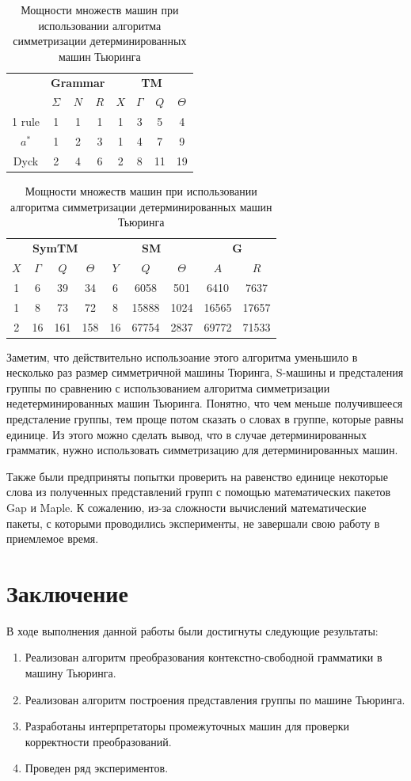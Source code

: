 \documentclass[14pt]{matmex-diploma-custom}
\begin{document}
\begin{table}[H]
\centering
\begin{tabular}{|c|
c|c|c|
c|c|c|c|}
\hline
&
\multicolumn{3}{|c|}{\textbf{Grammar}}&
\multicolumn{4}{|c|}{\textbf{TM}}\\
\cline{2-8}
&$\Sigma$&$N$&$R$
&$X$&$\Gamma$&$Q$&$\Theta$\\
\hline
1 rule
&1&1&1
&1&3&5&4\\
\hline
$a^*$
&1&2&3
&1&4&7&9\\
\hline
Dyck
&2&4&6
&2&8&11&19\\
\hline
\end{tabular}
\begin{tabular}{
|c|c|c|c|
c|c|c|
c|c|}
\hline
\multicolumn{4}{|c|}{\textbf{SymTM}}&
\multicolumn{3}{|c|}{\textbf{SM}}&
\multicolumn{2}{|c|}{\textbf{G}}\\
\cline{1-9}
$X$&$\Gamma$&$Q$&$\Theta$
&$Y$&$Q$&$\Theta$
&$A$&$R$\\
\hline
1&6&39&34
&6&6058&501
&6410&7637\\
\hline
1&8&73&72
&8&15888&1024
&16565&17657\\
\hline
2&16&161&158
&16&67754&2837
&69772&71533\\
\hline
\end{tabular}
\caption{Мощности множеств машин при использовании алгоритма симметризации детерминированных машин Тьюринга}
\label{tab:countdtm}
\end{table}

Заметим, что действительно использоание этого алгоритма уменьшило в несколько раз размер симметричной машины Тюринга, S-машины и предсталения группы по сравнению с использованием алгоритма симметризации недетерминированных машин Тьюринга. Понятно, что чем меньше получившееся предсталение группы, тем проще потом сказать о словах в группе, которые равны единице. Из этого можно сделать вывод, что в случае детерминированных грамматик, нужно использовать симметризацию для детерминированных машин.

Также были предприняты попытки проверить на равенство единице некоторые слова из полученных представлений групп с помощью математических пакетов Gap и Maple. К сожалению, из-за сложности вычислений математические пакеты, с которыми проводились эксперименты, не завершали свою работу в приемлемое время.

\section*{Заключение}
В ходе выполнения данной работы были достигнуты следующие результаты:
\begin{enumerate}
    \item Реализован алгоритм преобразования контекстно-свободной грамматики в машину Тьюринга.
    \item Реализован алгоритм построения представления группы по машине Тьюринга.
    \item Разработаны интерпретаторы промежуточных машин для проверки корректности преобразований.
    \item Проведен ряд экспериментов.
\end{enumerate}
\end{document}
